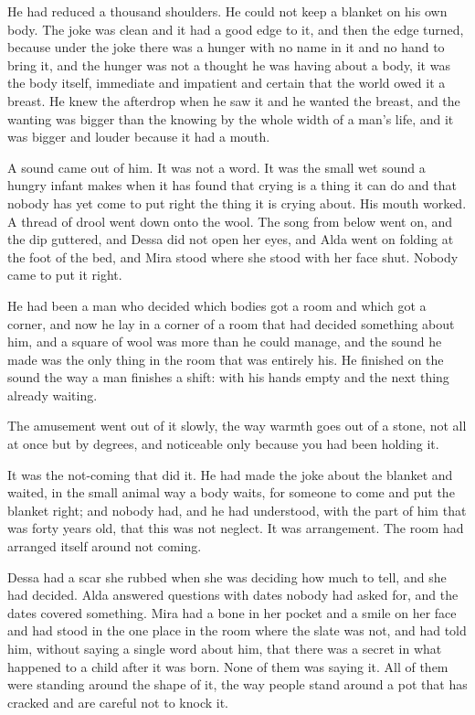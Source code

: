 He had reduced a thousand shoulders. He could not keep a blanket on his own body. The joke was clean and it had a good edge to it, and then the edge turned, because under the joke there was a hunger with no name in it and no hand to bring it, and the hunger was not a thought he was having about a body, it was the body itself, immediate and impatient and certain that the world owed it a breast. He knew the afterdrop when he saw it and he wanted the breast, and the wanting was bigger than the knowing by the whole width of a man's life, and it was bigger and louder because it had a mouth.

A sound came out of him. It was not a word. It was the small wet sound a hungry infant makes when it has found that crying is a thing it can do and that nobody has yet come to put right the thing it is crying about. His mouth worked. A thread of drool went down onto the wool. The song from below went on, and the dip guttered, and Dessa did not open her eyes, and Alda went on folding at the foot of the bed, and Mira stood where she stood with her face shut. Nobody came to put it right.

He had been a man who decided which bodies got a room and which got a corner, and now he lay in a corner of a room that had decided something about him, and a square of wool was more than he could manage, and the sound he made was the only thing in the room that was entirely his. He finished on the sound the way a man finishes a shift: with his hands empty and the next thing already waiting.

The amusement went out of it slowly, the way warmth goes out of a stone, not all at once but by degrees, and noticeable only because you had been holding it.

It was the not-coming that did it. He had made the joke about the blanket and waited, in the small animal way a body waits, for someone to come and put the blanket right; and nobody had, and he had understood, with the part of him that was forty years old, that this was not neglect. It was arrangement. The room had arranged itself around not coming.

Dessa had a scar she rubbed when she was deciding how much to tell, and she had decided. Alda answered questions with dates nobody had asked for, and the dates covered something. Mira had a bone in her pocket and a smile on her face and had stood in the one place in the room where the slate was not, and had told him, without saying a single word about him, that there was a secret in what happened to a child after it was born. None of them was saying it. All of them were standing around the shape of it, the way people stand around a pot that has cracked and are careful not to knock it.

